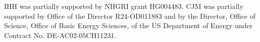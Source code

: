 
IHH was partially supported by NHGRI grant HG004483.
CJM was partially supported by Office of the Director R24-OD011883 and by the Director, Office of Science, Office of Basic Energy Sciences, of the US Department of Energy under Contract No. DE-AC02-05CH11231.
